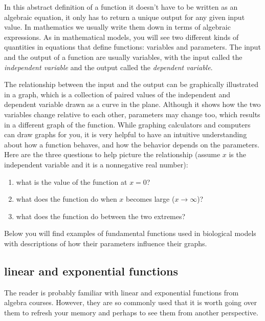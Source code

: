 \documentclass[
]{book}
\providecommand{\tightlist}{%
  \setlength{\itemsep}{0pt}\setlength{\parskip}{0pt}}
\theoremstyle{definition}
\theoremstyle{definition}
\theoremstyle{definition}
\theoremstyle{remark}
\begin{document}
In this abstract definition of a function it doesn't have to be written as an algebraic equation, it only has to return a unique output for any given input value. In mathematics we usually write them down in terms of algebraic expressions. As in mathematical models, you will see two different kinds of quantities in equations that define functions: variables and parameters. The input and the output of a function are usually variables, with the input called the  \emph{independent variable} and the output called the  \emph{dependent variable}.

The relationship between the input and the output can be graphically illustrated in a  graph, which is a collection of paired values of the independent and dependent variable drawn as a curve in the plane. Although it shows how the two variables change relative to each other, parameters may change too, which results in a different graph of the function. While graphing calculators and computers can draw graphs for you, it is very helpful to have an intuitive understanding about how a function behaves, and how the behavior depends on the parameters. Here are the three questions to help picture the relationship (assume \(x\) is the independent variable and it is a nonnegative real number):

\begin{enumerate}
\def\labelenumi{\arabic{enumi}.}
\tightlist
\item
  what is the value of the function at \(x=0\)?
\item
  what does the function do when \(x\) becomes large (\(x \to \infty\))?
\item
  what does the function do between the two extremes?
\end{enumerate}

Below you will find examples of fundamental functions used in biological models with descriptions of how their parameters influence their graphs.

\hypertarget{linear-and-exponential-functions}{%
\subsection{linear and exponential functions}\label{linear-and-exponential-functions}}

The reader is probably familiar with linear and exponential functions from algebra courses. However, they are so commonly used that it is worth going over them to refresh your memory and perhaps to see them from another perspective.
\end{document}
